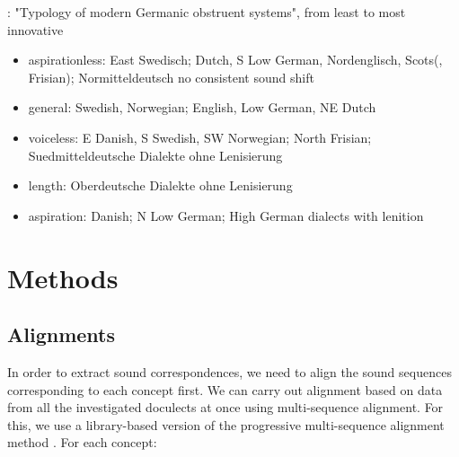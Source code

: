 \documentclass{article}
\begin{document}
\citet[pp. 215-235]{goblirsch2005lautverschiebungen}: "Typology of modern Germanic obstruent systems", from least to most innovative
\begin{itemize}
  \item aspirationless:
  East Swedisch; Dutch, S Low German, Nordenglisch, Scots(, Frisian); Normitteldeutsch
  no consistent sound shift
  \item general:
  Swedish, Norwegian; English, Low German, NE Dutch
  \item voiceless:
  E Danish, S Swedish, SW Norwegian; North Frisian; Suedmitteldeutsche Dialekte ohne Lenisierung
  \item length:
  Oberdeutsche Dialekte ohne Lenisierung
  \item aspiration:
  Danish; N Low German; High German dialects with lenition
\end{itemize}

\section{Methods}

\subsection{Alignments}
\label{s:alignments}

In order to extract sound correspondences, we need to align the sound sequences corresponding to each concept first.
We can carry out alignment based on data from all the investigated doculects at once using multi-sequence alignment.
For this, we use a library-based version \citet{notredame2000t-coffee:} of the progressive multi-sequence alignment method \citet{thompson1994clustal}.
For each concept:

\end{document}
